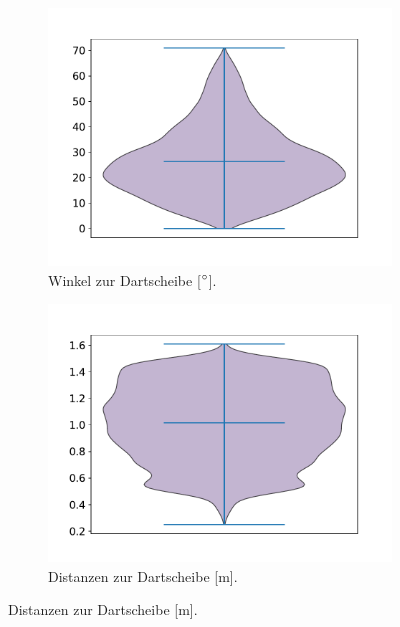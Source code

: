 \begin{figure}
    \centering
    \begin{subfigure}[b]{0.475\textwidth}
        \centering
        \includegraphics[width=\textwidth]{imgs/rendering/ergebnisse/cam_angles.pdf}
        \caption{Winkel zur Dartscheibe [$^{\circ}$].}
        \label{fig:cam_angle}
    \end{subfigure}
    \hfill
    \begin{subfigure}{0.475\textwidth}
        \centering
        \includegraphics[width=\textwidth]{imgs/rendering/ergebnisse/cam_dists.pdf}
        \caption{Distanzen zur Dartscheibe [m].}
        \label{fig:cam_dist}
    \end{subfigure}
    \par

\end{figure}
